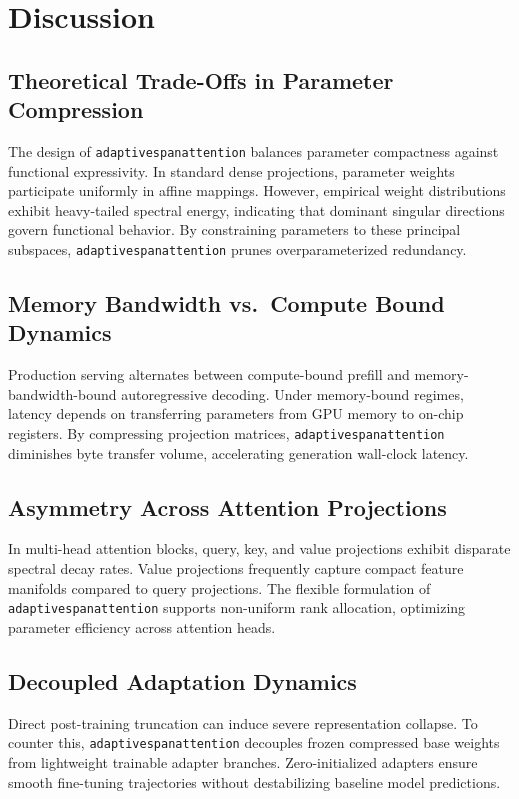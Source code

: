 \section{Discussion}

\subsection{Theoretical Trade-Offs in Parameter Compression}
The design of \texttt{adaptivespanattention} balances parameter compactness against functional expressivity. In standard dense projections, parameter weights participate uniformly in affine mappings. However, empirical weight distributions exhibit heavy-tailed spectral energy, indicating that dominant singular directions govern functional behavior. By constraining parameters to these principal subspaces, \texttt{adaptivespanattention} prunes overparameterized redundancy.

\subsection{Memory Bandwidth vs.\ Compute Bound Dynamics}
Production serving alternates between compute-bound prefill and memory-bandwidth-bound autoregressive decoding. Under memory-bound regimes, latency depends on transferring parameters from GPU memory to on-chip registers. By compressing projection matrices, \texttt{adaptivespanattention} diminishes byte transfer volume, accelerating generation wall-clock latency.

\subsection{Asymmetry Across Attention Projections}
In multi-head attention blocks, query, key, and value projections exhibit disparate spectral decay rates. Value projections frequently capture compact feature manifolds compared to query projections. The flexible formulation of \texttt{adaptivespanattention} supports non-uniform rank allocation, optimizing parameter efficiency across attention heads.

\subsection{Decoupled Adaptation Dynamics}
Direct post-training truncation can induce severe representation collapse. To counter this, \texttt{adaptivespanattention} decouples frozen compressed base weights from lightweight trainable adapter branches. Zero-initialized adapters ensure smooth fine-tuning trajectories without destabilizing baseline model predictions.

